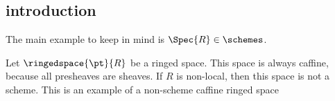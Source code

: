 \subsection{introduction}





\begin{example}
The main example to keep in mind is $\Spec{R} \in \schemes$.



Let $\ringedspace{\pt}{R}$ be a ringed space. This space is always caffine, because all presheaves are sheaves.
If $R$ is non-local, then this space is not a scheme. 
This is an example of a non-scheme caffine ringed space
\end{example}
